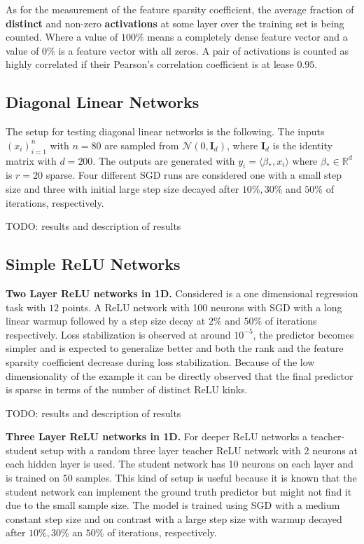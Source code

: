 As for the measurement of the feature sparsity coefficient, the average
fraction of \textbf{distinct} and non-zero \textbf{activations} at some layer
over the training set is being counted. Where a value of $100\%$ means a
completely dense feature vector and a value of $0\%$ is a feature vector with
all zeros. A pair of activations is counted as highly correlated if their
Pearson's correlation coefficient is at lease $0.95$.

\subsection{Diagonal Linear Networks}
The setup for testing diagonal linear networks is the following. The inputs
$(x_i)_{i=1}^{n}$ with $n=80$ are sampled from $\mathcal{N}(0,
\mathbf{I}_d)$, where $\mathbf{I}_d$ is the identity matrix with $d=200$. The
outputs are generated with $y_i = \langle \beta_* , x_i\rangle$ where
$\beta_* \in \mathbb{R}^{d}$ is $r=20$ sparse. Four different SGD runs are
considered one with a small step size and three with initial large step size
decayed after  $10\%, 30\%$ and $50\%$ of iterations, respectively.

TODO: results and description of results

\subsection{Simple ReLU Networks}
\textbf{Two Layer ReLU networks in 1D.}
Considered is a one dimensional regression task with $12$ points. A ReLU
network with 100 neurons with SGD with a long linear warmup followed by a
step size decay at $2\%$ and $50\%$ of iterations respectively. Loss
stabilization is observed at around $10^{-5}$, the predictor becomes simpler
and is expected to generalize better and both the rank and the feature
sparsity coefficient decrease during loss stabilization. Because of the
low dimensionality of the example it can be directly observed that the final
predictor is sparse in terms of the number of distinct ReLU kinks.

TODO: results and description of results

\textbf{Three Layer ReLU networks in 1D.}
For deeper ReLU networks a teacher-student setup with a random three layer
teacher ReLU network with 2 neurons at each hidden layer is used. The student
network has 10 neurons on each layer and is trained on $50$ samples. This
kind of setup is useful because it is known that the student network can
implement the ground truth predictor but might not find it due to the small
sample size. The model is trained using SGD with a medium constant step size
and on contrast with a large step size with warmup decayed after $10\%, 30\%$
an $50\%$ of iterations, respectively.


